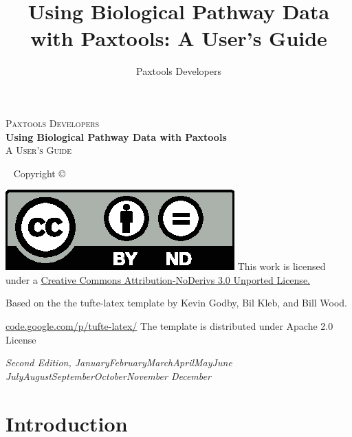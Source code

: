 \documentclass{tufte-book}
\title{Using Biological Pathway Data with Paxtools: A User's Guide}
\author[Paxtools Developers]{Paxtools Developers}
\newcommand{\monthyear}{%
\ifcase\month\or January\or February\or March\or April\or May\or June\or
July\or August\or September\or October\or November\or
December\fi\space\number\year
}
\newenvironment{tightcenter}{%
  \setlength\topsep{0pt}
  \setlength\parskip{0pt}
  \begin{center}
}{%
  \end{center}
}
\begin{document}
\begin{titlepage}
\begin{tightcenter}


\textsc{\LARGE Paxtools Developers}\\[5.5cm]



{ \huge \bfseries Using Biological Pathway Data with Paxtools}\\[0.4cm]


\textsc{\Large  A User's Guide}\\[0.5cm]

\end{tightcenter}

\begin{fullwidth}
~\vfill
\thispagestyle{empty}
\setlength{\parindent}{0pt}
\setlength{\parskip}{\baselineskip}
Copyright \copyright\ \the\year\ \thanklessauthor


\par{}

\par \includegraphics[width=\linewidth/10]{by-nd.eps}  This work is licensed under a \href{http://creativecommons.org/licenses/by-nd/3.0/deed.en_US} {Creative Commons Attribution-NoDerivs 3.0 Unported License.} 
\par Based on the the tufte-latex template by Kevin Godby, Bil Kleb, and Bill Wood. 
\par \url{code.google.com/p/tufte-latex/} The template is distributed under Apache 2.0 License
\par\textit{Second Edition, \monthyear}
\end{fullwidth}
\end{titlepage}
\tableofcontents


\cleardoublepage
\chapter*{Introduction}
\end{document}
